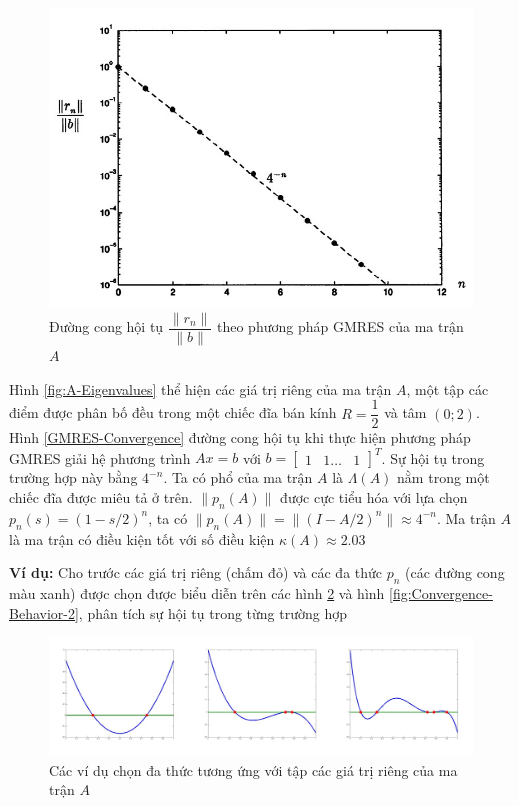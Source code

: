 \documentclass[14pt, a4paper]{article}
\numberwithin{equation}{section}
\numberwithin{algorithm}{section}
\numberwithin{figure}{section}
\numberwithin{dl}{section}
\numberwithin{md}{section}
\numberwithin{bd}{section}
\numberwithin{dn}{section}
\numberwithin{hq}{section}
\begin{document}
\begin{figure}[h!] \centering

    \includegraphics[scale=0.6]{GMRES-Convergence-Curve.jpg}
    \caption{Đường cong hội tụ $\dfrac{\lVert r_n \rVert}{\lVert b \rVert} $ theo phương pháp GMRES của ma trận $A$ \cite{trefethen1997numerical}}

    \label{fig:GMRES-Convergence-Curve}
\end{figure}

Hình \ref{fig:A-Eigenvalues} thể hiện các giá trị riêng của ma trận $A$, một tập các điểm được phân bố đều trong một chiếc đĩa bán kính $R=\dfrac{1}{2}$ và tâm $(0;2)$. Hình \ref{GMRES-Convergence} đường cong hội tụ khi thực hiện phương pháp GMRES giải hệ phương trình $Ax=b$ với $b=\begin{bmatrix} 1 & 1 \dots & 1 \end{bmatrix}^T$. Sự hội tụ trong trường hợp này bằng $4^{-n}$. Ta có phổ của ma trận $A$ là $\Lambda(A)$ nằm trong một chiếc đĩa được miêu tả ở trên. $\lVert p_n(A) \rVert $ được cực tiểu hóa với lựa chọn $p_n(s)=(1-s/2)^n$, ta có $\lVert p_n(A) \rVert = \lVert (I - A/2)^n \rVert \approx 4^{-n}$. Ma trận $A$ là ma trận có điều kiện tốt với số điều kiện $\kappa(A) \approx 2.03$

\textbf{Ví dụ:} Cho trước các giá trị riêng (chấm đỏ) và các đa thức $p_n$ (các đường cong màu xanh) được chọn được biểu diễn trên các hình \ref{fig:Convergence-Behavior-1} và hình \ref{fig:Convergence-Behavior-2}, phân tích sự hội tụ trong từng trường hợp

\begin{figure}[h!] \centering

    \includegraphics[scale=0.5]{Convergence-Behavior-1.jpg}
    \caption{Các ví dụ chọn đa thức tương ứng với tập các giá trị riêng của ma trận $A$}

    \label{fig:Convergence-Behavior-1}
\end{figure}
\end{document}
